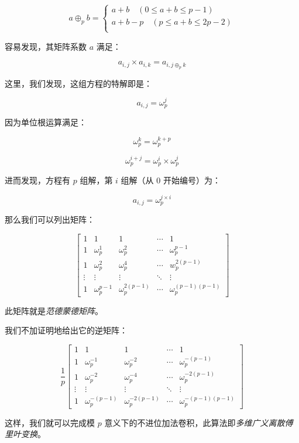 \documentclass{article}
\begin{document}
$$
a \oplus_p b  =
\left\{
    \begin{array}{l}
        a+b \quad (0 \le a+b \le p-1) \\
        a+b-p \quad (p \le a+b \le 2p-2) \\
    \end{array}
\right.
$$

容易发现，其矩阵系数 $a$ 满足：

$$a_{i,j} \times a_{i,k}=a_{i,j \oplus_p k}$$

这里，我们发现，这组方程的特解即是：

$$a_{i,j} = \omega_{p}^j$$

因为单位根运算满足：

$$\omega_{p}^k = \omega_{p}^{k+p}$$

$$\omega_{p}^{i+j} = \omega_{p}^i \times \omega_{p}^j$$

进而发现，方程有 $p$ 组解，第 $i$ 组解（从 $0$ 开始编号）为：

$$a_{i,j} = \omega_{p}^{j \times i}$$

那么我们可以列出矩阵：

$$
\begin{bmatrix} 1& 1 & 1& \cdots & 1\\ 1& \omega_p^1& \omega_p^2& \cdots & \omega_p^{p - 1}\\ 1& \omega_p^2 & \omega_p^4& \cdots & w_p^{2(p - 1)}\\ \vdots& \vdots& \vdots& \ddots& \vdots\\ 1& \omega_p^{p - 1}& \omega_p^{2(p - 1)} & \cdots & \omega_p^{(p - 1)(p - 1)} \end{bmatrix}
$$

此矩阵就是\textsl{范德蒙德矩阵}。

我们不加证明地给出它的逆矩阵：

$$
\frac 1 p \begin{bmatrix} 1& 1 & 1& \cdots & 1\\ 1& \omega_p^{-1}& \omega_p^{-2}& \cdots & \omega_p^{-(p - 1)}\\ 1& \omega_p^{-2} & \omega_p^{-4}& \cdots & \omega_p^{-2(p - 1)}\\ \vdots& \vdots& \vdots& \ddots& \vdots\\ 1& \omega_p^{-(p - 1)}& \omega_p^{-2(p - 1)} & \cdots & \omega_p^{-(p - 1)(p - 1)} \end{bmatrix}
$$

这样，我们就可以完成模 $p$ 意义下的不进位加法卷积，此算法即\textsl{多维广义离散傅里叶变换}。
\end{document}
